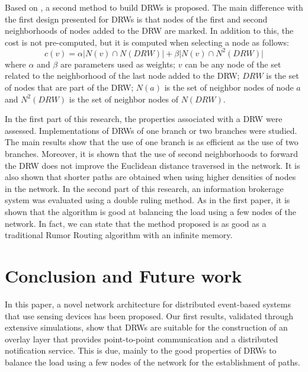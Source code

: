 \documentclass[conference]{IEEEtran}
\begin{document}
Based on \cite{SENSORNETS14DRW}, a second method to build DRWs is proposed. The main difference with the first design presented for DRWs is that nodes of the first and second neighborhoods of nodes added to the DRW are marked. In addition to this, the cost is not pre-computed, but it is computed when selecting a node as follows:
\begin{equation}
\label{DRW Cristina}
c(v) = \alpha \vert N(v) \cap N(DRW) \vert + \beta \vert N(v) \cap N^2(DRW) \vert
\end{equation}
where $\alpha$ and $\beta$ are parameters used as weights; $v$ can be any node of the set related to the neighborhood of the last node added to the DRW; $DRW$ is the set of nodes that are part of the DRW; $N(a)$ is the set of neighbor nodes of node $a$ and $N^2(DRW)$ is the set of neighbor nodes of $N(DRW)$.

In the first part of this research, the properties associated with a DRW were assessed. Implementations of DRWs of one branch or two branches were studied. The main results show that the use of one branch is as efficient as the use of two branches. Moreover, it is shown that the use of second neighborhoods to forward the DRW does not improve the Euclidean distance traversed in the network. It is also shown that shorter paths are obtained when using higher densities of nodes in the network. In the second part of this research, an information brokerage system was evaluated using a double ruling method. As in the first paper, it is shown that the algorithm is good at balancing the load using a few nodes of the network. In fact, we can state that the method proposed is as good as a traditional Rumor Routing algorithm \cite{Braginsky:2002:RRA:570738.570742} with an infinite memory.


\vspace{0.5em}
\section{Conclusion and Future work}
\label{sec:conclusion}

In this paper, a  novel network architecture for distributed event-based systems that use sensing devices has been proposed. Our first results, validated through extensive simulations, show that DRWs are suitable for the construction of an overlay layer that provides point-to-point communication and a distributed notification service. This is due, mainly to the good properties of DRWs to balance the load using a few nodes of the network for the establishment of paths. 
\end{document}
